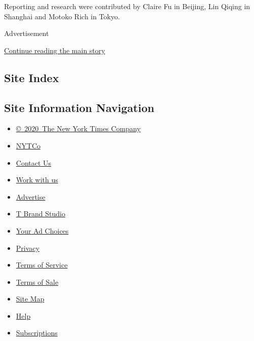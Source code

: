 Reporting and research were contributed by Claire Fu in Beijing, Lin
Qiqing in Shanghai and Motoko Rich in Tokyo.

Advertisement

\protect\hyperlink{after-bottom}{Continue reading the main story}

\hypertarget{site-index}{%
\subsection{Site Index}\label{site-index}}

\hypertarget{site-information-navigation}{%
\subsection{Site Information
Navigation}\label{site-information-navigation}}

\begin{itemize}
\tightlist
\item
  \href{https://help.nytimes3xbfgragh.onion/hc/en-us/articles/115014792127-Copyright-notice}{©~2020~The
  New York Times Company}
\end{itemize}

\begin{itemize}
\tightlist
\item
  \href{https://www.nytco.com/}{NYTCo}
\item
  \href{https://help.nytimes3xbfgragh.onion/hc/en-us/articles/115015385887-Contact-Us}{Contact
  Us}
\item
  \href{https://www.nytco.com/careers/}{Work with us}
\item
  \href{https://nytmediakit.com/}{Advertise}
\item
  \href{http://www.tbrandstudio.com/}{T Brand Studio}
\item
  \href{https://www.nytimes3xbfgragh.onion/privacy/cookie-policy\#how-do-i-manage-trackers}{Your
  Ad Choices}
\item
  \href{https://www.nytimes3xbfgragh.onion/privacy}{Privacy}
\item
  \href{https://help.nytimes3xbfgragh.onion/hc/en-us/articles/115014893428-Terms-of-service}{Terms
  of Service}
\item
  \href{https://help.nytimes3xbfgragh.onion/hc/en-us/articles/115014893968-Terms-of-sale}{Terms
  of Sale}
\item
  \href{https://spiderbites.nytimes3xbfgragh.onion}{Site Map}
\item
  \href{https://help.nytimes3xbfgragh.onion/hc/en-us}{Help}
\item
  \href{https://www.nytimes3xbfgragh.onion/subscription?campaignId=37WXW}{Subscriptions}
\end{itemize}

